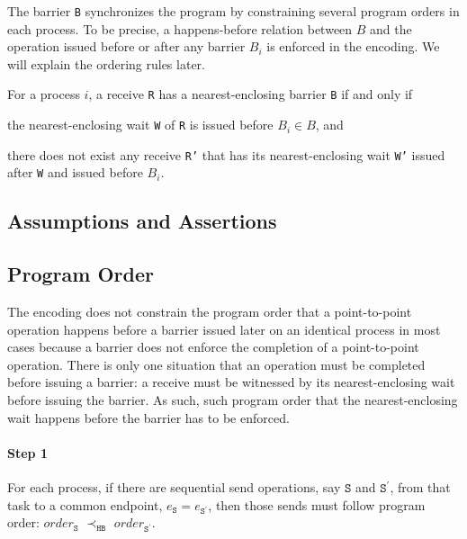 
The barrier \texttt{B} synchronizes the program by constraining several program orders in each process. To be precise, a happens-before relation between $B$ and the operation issued before or after any barrier $B_i$ is enforced in the encoding. We will explain the ordering rules later.

\begin{definition}\label{def:nb}
For a process $i$, a receive \texttt{R} has a nearest-enclosing barrier \texttt{B} if and only if
\begin{compactenum}
\item the nearest-enclosing wait \texttt{W} of \texttt{R} is issued before $B_i\in B$, and
\item there does not exist any receive \texttt{R'} that has its nearest-enclosing wait \texttt{W'} issued after \texttt{W} and issued before $B_i$.
\end{compactenum}
\end{definition}


\subsection{Assumptions and Assertions}

\subsection{Program Order}
The encoding does not constrain the program order that a point-to-point operation happens before a barrier issued later on an identical process in most cases because a barrier does not enforce the completion of a point-to-point operation. There is only one situation that an operation must be completed before issuing a barrier: a receive must be witnessed by its nearest-enclosing wait before issuing the barrier. As such, such program order that the nearest-enclosing wait happens before the barrier has to be enforced.

\paragraph*{Step 1} For each process, if there are sequential send
operations, say $\mathtt{S}$ and $\mathtt{S^\prime}$, from that task
to a common endpoint, $e_\mathtt{S} = e_\mathtt{S^\prime}$, then those
sends must follow program order: $\mathit{order}_\mathtt{S}$
$\prec_\mathtt{HB}$ $\mathit{order}_\mathtt{S^\prime}$.

